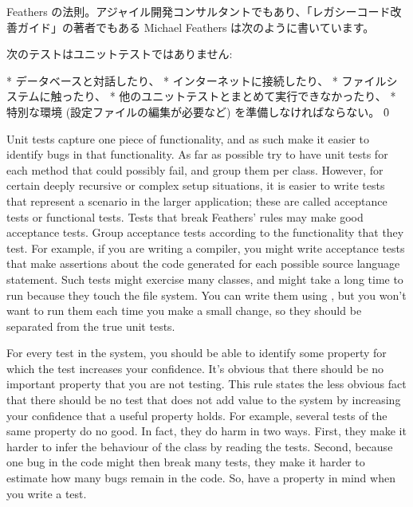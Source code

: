 \documentclass[a4paper,10pt,twoside]{book}
\begin{document}
{{\begin{description}
Feathers の法則。アジャイル開発コンサルタントでもあり、「レガシーコード改善ガイド」の著者でもある Michael Feathers は次のように書いています。

次のテストはユニットテストではありません:

* データベースと対話したり、
* インターネットに接続したり、
* ファイルシステムに触ったり、
* 他のユニットテストとまとめて実行できなかったり、
* 特別な環境 (設定ファイルの編集が必要など) を準備しなければならない。
\f0

\item[Unit Tests \textit{vs.}\ Acceptance Tests.] Unit tests capture one piece of
  functionality, and as such make it easier to identify bugs in that functionality.
  As far as
  possible try to have unit tests for each method that could possibly fail, and group them per class.
  However,
  for certain deeply recursive or complex setup situations, it is
  easier to write tests that represent a scenario in the larger application; these are called acceptance 
  tests or functional tests.
  Tests that break Feathers' rules may make good acceptance tests.
  Group acceptance tests according to the functionality that they test.
  For example, if you are writing a compiler, you might write acceptance tests that make 
  assertions about the code generated for each possible source language statement.
  Such tests might exercise many classes, and might take a long time to run because they touch the 
  file system.
  You can write them using \sunit, but you won't want to run them each time you make a small change,
  so they should be separated from the true unit tests.
 
\item[Black's Rule of Testing.]
  For every test in the system, you should be able to identify some property for which
  the test increases your confidence.
  It's obvious that there should be no important property that you are not testing.
  This rule states the less obvious fact that there should be
  no test that does not add value to the system by increasing your confidence that a useful property
  holds.
  For example, several tests of the same property do no good. 
  In fact, they do harm in two ways.
  First, they make it harder to infer the behaviour of the class by reading the tests. 
  Second, 
  because one bug in the code might then break many tests, they make it harder to estimate how many bugs remain in the code.
  So, have a property in mind when you write a test.
\end{description}

}}
\end{document}
